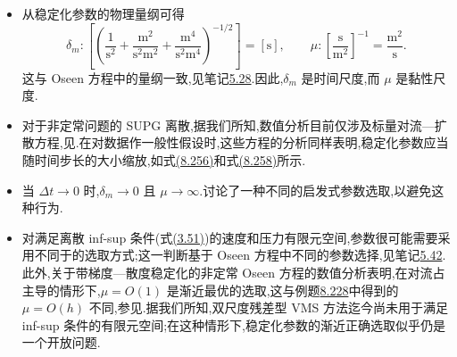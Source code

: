 \begin{note}[稳定化参数的若干说明]
\label{note:vms-stabilization-parameter-comments}
\begin{itemize}
 \item 从稳定化参数的物理量纲可得
 \[
 \delta_m:\left[\left(\frac1{\mathrm{s}^2}
 +\frac{\mathrm{m}^2}{\mathrm{s}^2\mathrm{m}^2}
 +\frac{\mathrm{m}^4}{\mathrm{s}^2\mathrm{m}^4}\right)^{-1/2}\right]
 =[\mathrm{s}],\qquad
 \mu:\left[\frac{\mathrm{s}}{\mathrm{m}^2}\right]^{-1}
 =\frac{\mathrm{m}^2}{\mathrm{s}}.
 \]
 这与 Oseen 方程中的量纲一致,见笔记\hyperref[note:oseen-spg-parameter-dimensions]{5.28}.因此,$\delta_m$ 是时间尺度,而 $\mu$ 是黏性尺度.
 \item 对于非定常问题的 SUPG 离散,据我们所知,数值分析目前仅涉及标量对流—扩散方程,见\textcite{JohnNovo2011}.在对数据作一般性假设时,这些方程的分析同样表明,稳定化参数应当随时间步长的大小缩放,如式\hyperref[eq:vms-momentum-stabilization-parameter]{(8.256)}和式\hyperref[eq:vms-cube-momentum-stabilization-parameter]{(8.258)}所示.
 \item 当 $\Delta t\to0$ 时,$\delta_m\to0$ 且 $\mu\to\infty$.\textcite{HsuBazilevsCaloTezduyarHughes2010}讨论了一种不同的启发式参数选取,以避免这种行为.
 \item 对满足离散 inf-sup 条件(式\hyperref[eq:discrete-infsup-condition]{(3.51)})的速度和压力有限元空间,参数很可能需要采用不同于\textcite{Bazilevs2007}的选取方式;这一判断基于 Oseen 方程中不同的参数选择,见笔记\hyperref[note:oseen-optimal-stabilization]{5.42}.此外,关于带梯度—散度稳定化的非定常 Oseen 方程的数值分析表明,在对流占主导的情形下,$\mu=O(1)$ 是渐近最优的选取,这与例题\hyperref[ex:vms-axis-aligned-cube]{8.228}中得到的 $\mu=O(h)$ 不同,参见\textcite{deFrutos2016b}.据我们所知,双尺度残差型 VMS 方法迄今尚未用于满足 inf-sup 条件的有限元空间;在这种情形下,稳定化参数的渐近正确选取似乎仍是一个开放问题.
\end{itemize}
\end{note}

